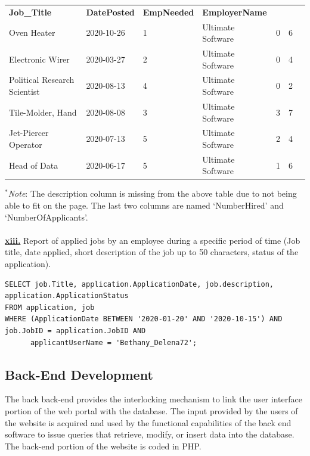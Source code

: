\documentclass[11pt]{article}
\begin{document}
\begin{table}[]
\begin{tabular}{lllllll}
\textbf{Job\_Title}  & \textbf{DatePosted}  & \textbf{EmpNeeded} & \textbf{EmployerName} &  & \\
Oven Heater                   & 2020-10-26  & 1 & Ultimate Software & 0 & 6 \\
Electronic Wirer              & 2020-03-27 & 2 & Ultimate Software & 0 & 4 \\
Political Research Scientist  & 2020-08-13 & 4 & Ultimate Software & 0 & 2 \\
Tile-Molder, Hand             & 2020-08-08 & 3 & Ultimate Software & 3 & 7 \\
Jet-Piercer Operator          & 2020-07-13 & 5 & Ultimate Software & 2 & 4 \\
Head of Data                  & 2020-06-17 & 5 & Ultimate Software & 1 & 6 \\
\end{tabular}
\end{table}

$^{*}$\textit{Note}: The description column is missing from the above table due to not being able to fit on the page. The last two columns are named `NumberHired' and `NumberOfApplicants'. \\
\\

\underline{\textbf{xiii.}} Report of applied jobs by an employee during a specific period of time
(Job title, date applied, short description of the job up to 50 characters,
status of the application). \\

\begin{verbatim}
SELECT job.Title, application.ApplicationDate, job.description, 
application.ApplicationStatus
FROM application, job
WHERE (ApplicationDate BETWEEN '2020-01-20' AND '2020-10-15') AND 
job.JobID = application.JobID AND
      applicantUserName = 'Bethany_Delena72';
\end{verbatim}



\subsection{Back-End Development}

The back back-end provides the interlocking mechanism to link the user interface portion of the web portal with the database. The input provided by the users of the website is acquired and used by the functional capabilities of the back end software to issue queries that retrieve, modify, or insert data into the database. The back-end portion of the website is coded in PHP.
\end{document}

